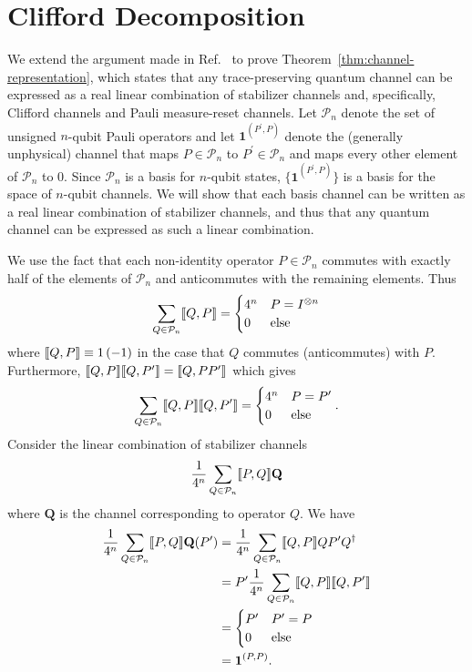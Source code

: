 \documentclass[twocolumn,pra]{revtex4}
\newcommand{\bs}[1]{\boldsymbol{#1}}
\begin{document}
\section{Clifford Decomposition} 
\label{sec:decomp}
We extend the argument made in Ref.~\cite{Kimmel2014} to prove Theorem~\ref{thm:channel-representation}, which states that any trace-preserving quantum channel can be expressed as a real linear combination of stabilizer channels and, specifically, Clifford channels and Pauli measure-reset channels. Let $\mathcal{P}_{n}$ denote the set of unsigned $n$-qubit Pauli operators and let $\bs{1}^{(P^{\prime},P)}$ denote the (generally unphysical) channel that maps $P \in \mathcal{P}_{n}$ to $P^\prime \in \mathcal{P}_{n}$ and maps every other element of $\mathcal{P}_{n}$ to 0. 
Since $\mathcal{P}_{n}$ is a basis for $n$-qubit states, $\{\bs{1}^{(P^{\prime},P)}\}$ is a basis for the space of $n$-qubit channels. 
We will show that each basis channel can be written as a real linear combination of stabilizer channels, and thus that any quantum channel can be expressed as such a linear combination.
\par
We use the fact that each non-identity operator $P\in\mathcal{P}_{n}$ commutes with exactly half of the elements
of $\mathcal{P}_{n}$ and anticommutes with the remaining elements.
Thus 
\begin{gather}
\sum_{Q\in\mathcal{P}_{n}}\llbracket Q,P\rrbracket=\begin{cases}
4^{n} & P= I^{\otimes n}\\
0 & \text{else}
\end{cases}
\end{gather}
where $\llbracket Q,P\rrbracket\equiv1\,(-1)$ in the case that $Q$ commutes
(anticommutes) with $P$.  Furthermore, $\llbracket Q,P\rrbracket\llbracket Q,P^{\prime}\rrbracket=\llbracket Q,PP^{\prime}\rrbracket$
which gives
\begin{gather}
\sum_{Q\in\mathcal{P}_{n}}\llbracket Q,P\rrbracket\llbracket Q,P^{\prime}\rrbracket=
\begin{cases}
4^{n} & P= P^{\prime}\\
0 & \text{else}
\end{cases}.
\end{gather}
Consider the linear combination of stabilizer channels 
\begin{gather}
\frac{1}{4^{n}}\sum_{Q\in\mathcal{P}_{n}}\llbracket P,Q\rrbracket\mathbf{Q}
\end{gather}
where $\mathbf{Q}$ is the channel corresponding to operator $Q$.
We have
\begin{align}
\frac{1}{4^{n}}\sum_{Q\in\mathcal{P}_{n}}\comsign{P,Q}\mathbf{Q} (P^{\prime}) & =\frac{1}{4^{n}}\sum_{Q\in\mathcal{P}_{n}}\comsign{Q,P}QP^{\prime}Q^{\dagger}\nonumber \\
 & =P^{\prime}\frac{1}{4^{n}}\sum_{Q\in\mathcal{P}_{n}}\comsign{Q,P}\comsign{Q,P^{\prime}}\\
 & =\begin{cases}
P^{\prime} & P^{\prime}= P\\
0 & \text{else}
\end{cases}\\
 & =\bs{1}^{(P,P)}.
\end{align}
\end{document}
